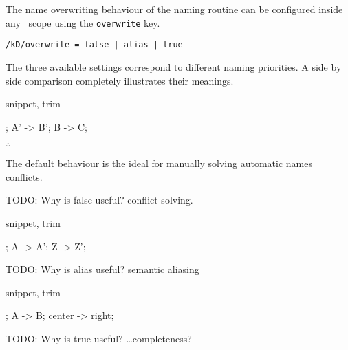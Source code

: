 The name overwriting behaviour of the naming routine can be configured
inside any \koDi\ scope using the \lstinline!overwrite! key.

\begin{lstlisting}
/kD/overwrite = false | alias | true
\end{lstlisting}

The three available settings correspond to different naming priorities.
A side by side comparison completely illustrates their meanings.

\begin{tcblisting}{snippet, trim}
\begin{kodi}
; %
\mor A' -> B';
\mor B  -> C;
\end{kodi}
\end{tcblisting}

\hfill$\therefore$\hfill\null

The default behaviour is the ideal for manually solving automatic names
conflicts.

TODO: Why is false useful? conflict solving.

\begin{tcblisting}{snippet, trim}
\begin{kodi}[golden]
;
\mor A -> A';
\mor Z -> Z';
\end{kodi}
\end{tcblisting}

TODO: Why is alias useful? semantic aliasing

\begin{tcblisting}{snippet, trim}
\begin{kodi}
;
\mor A -> B;
\mor center -> right;
\end{kodi}
\end{tcblisting}

TODO: Why is true useful? \ldots completeness?
